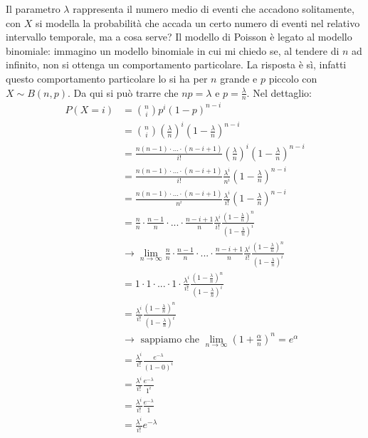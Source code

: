\documentclass[11pt]{report}
\begin{document}
Il parametro $\lambda$ rappresenta il numero medio di eventi che accadono solitamente, con $X$ si modella la probabilità che accada un certo numero di eventi nel relativo intervallo temporale, ma a cosa serve? Il modello di Poisson è legato al modello binomiale: immagino un modello binomiale in cui mi chiedo se, al tendere di $n$ ad infinito, non si ottenga un comportamento particolare. La risposta è sì, infatti questo comportamento particolare lo si ha per $n$ grande e $p$ piccolo con $X \sim B(n,p)$. Da qui si può trarre che $np = \lambda$ e $p = \frac{\lambda}{n}$. Nel dettaglio:
\begin{equation}
    \begin{split}
        P(X=i) & = \binom{n}{i}p^i(1-p)^{n-i}\\
        & = \binom{n}{i} \left( \frac{\lambda}{n} \right)^i \left( 1 - \frac{\lambda}{n} \right)^{n-i}\\
        & = \frac{n(n-1) \cdot ... \cdot (n-i+1)}{i!} \left( \frac{\lambda}{n} \right)^i \left( 1 - \frac{\lambda}{n} \right)^{n-i}\\
        & = \frac{n(n-1) \cdot ... \cdot (n-i+1)}{i!} \frac{\lambda^i}{n^i} \left( 1 - \frac{\lambda}{n} \right)^{n-i}\\
        & = \frac{n(n-1) \cdot ... \cdot (n-i+1)}{n^i} \frac{\lambda^i}{i!} \left( 1 - \frac{\lambda}{n} \right)^{n-i}\\
        & = \frac{n}{n} \cdot \frac{n-1}{n} \cdot ... \cdot \frac{n-i+1}{n} \frac{\lambda^i}{i!} \frac{\left( 1 - \frac{\lambda}{n} \right)^n}{\left( 1 - \frac{\lambda}{n} \right)^i}\\
        & \rightarrow \lim_{n\to\infty} \frac{n}{n} \cdot \frac{n-1}{n} \cdot ... \cdot \frac{n-i+1}{n} \frac{\lambda^i}{i!} \frac{\left( 1 - \frac{\lambda}{n} \right)^n}{\left( 1 - \frac{\lambda}{n} \right)^i}\\
        & = 1 \cdot 1 \cdot ... \cdot 1 \cdot \frac{\lambda^i}{i!} \frac{\left( 1 - \frac{\lambda}{n} \right)^n}{\left( 1 - \frac{\lambda}{n} \right)^i}\\
        & = \frac{\lambda^i}{i!} \frac{\left( 1 - \frac{\lambda}{n} \right)^n}{\left( 1 - \frac{\lambda}{n} \right)^i}\\
        & \rightarrow \text{ sappiamo che } \lim_{n\to\infty} \left( 1 + \frac{\alpha}{n} \right)^n = e^\alpha\\
        & = \frac{\lambda^i}{i!} \frac{e^{-\lambda}}{(1-0)^i}\\
        & = \frac{\lambda^i}{i!} \frac{e^{-\lambda}}{1^i}\\
        & = \frac{\lambda^i}{i!} \frac{e^{-\lambda}}{1}\\
        & = \frac{\lambda^i}{i!} e^{-\lambda}\\
    \end{split}
\end{equation}
\end{document}

